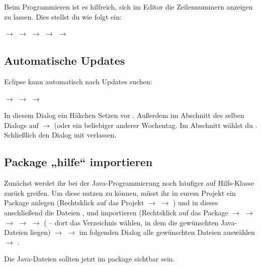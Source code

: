 Beim Programmieren ist es hilfreich, sich im Editor die Zeilennummern anzeigen
zu lassen. Dies stellst du wie folgt ein:

 $\rightarrow$  $\rightarrow$
 $\rightarrow$  $\rightarrow$  $\rightarrow$ 

\subsection{Automatische Updates} 

Eclipse kann automatisch nach Updates suchen:

 $\rightarrow$  $\rightarrow$
 $\rightarrow$  

In diesem Dialog ein Häkchen Setzen vor . Außerdem im Abschnitt  des selben
Dialogs auf  $\rightarrow$
 (oder ein beliebiger anderer Wochentag. Im Abschnitt
 wählst du . Schließlich den Dialog mit
 verlassen.

\subsection{Package „hilfe“ importieren}

Zunächst werdet ihr bei der Java-Programmierung noch häufiger auf Hilfs-Klasse
 zurück greifen. Um diese nutzen zu können, müsst ihr in eurem
Projekt ein Package  anlegen (Rechtsklick auf das Projekt
$\rightarrow$  $\rightarrow$ ) und in dieses
anschließend die Dateien  ,  und
 importieren (Rechtsklick auf das Package
$\rightarrow$  $\rightarrow$ 
$\rightarrow$  $\rightarrow$  $\rightarrow$
 ( -- dort das Verzeichnis wählen, in dem
die gewünschten Java-Dateien liegen) $\rightarrow$  $\rightarrow$
im folgenden Dialog alle gewünschten Dateien auswählen $\rightarrow$
.

Die Java-Dateien sollten jetzt im package  sichtbar sein.


